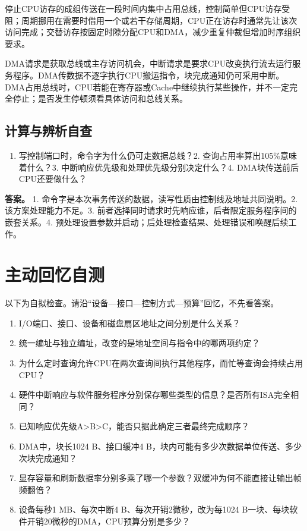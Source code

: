 停止CPU访存的成组传送在一段时间内集中占用总线，控制简单但CPU访存受阻；周期挪用在需要时借用一个或若干存储周期，CPU正在访存时通常先让该次访问完成；交替访存按固定时隙分配CPU和DMA，减少重复仲裁但增加时序组织要求。

DMA请求是获取总线或主存访问机会，中断请求是要求CPU改变执行流去运行服务程序。DMA传数据不逐字执行CPU搬运指令，块完成通知仍可采用中断。DMA占用总线时，CPU若能在寄存器或Cache中继续执行某些操作，并不一定完全停止；是否发生停顿须看具体访问和总线关系。

\subsection{计算与辨析自查}\label{CO07-extra-check}

\begin{enumerate}
\def\labelenumi{\arabic{enumi}.}
\tightlist
\item
  写控制端口时，命令字为什么仍可走数据总线？2. 查询占用率算出105\%意味着什么？3. 中断响应优先级和处理优先级分别决定什么？4. DMA块传送前后CPU还要做什么？
\end{enumerate}

\textbf{答案。} 1. 命令字是本次事务传送的数据，读写性质由控制线及地址共同说明。2. 该方案处理能力不足。3. 前者选择同时请求时先响应谁，后者限定服务程序间的嵌套关系。4. 预处理设置参数并启动；后处理检查结果、处理错误和唤醒后续工作。

\section{主动回忆自测}\label{CO07-recall}

以下为自拟检查。请沿``设备---接口---控制方式---预算''回忆，不先看答案。

\begin{enumerate}
\def\labelenumi{\arabic{enumi}.}
\tightlist
\item
  I/O端口、接口、设备和磁盘扇区地址之间分别是什么关系？
\item
  统一编址与独立编址，改变的是地址空间与指令中的哪两项约定？
\item
  为什么定时查询允许CPU在两次查询间执行其他程序，而忙等查询会持续占用CPU？
\item
  硬件中断响应与软件服务程序分别保存哪些类型的信息？是否所有ISA完全相同？
\item
  已知响应优先级A\textgreater B\textgreater C，能否只据此确定三者最终完成顺序？
\item
  DMA中，块长1024 B、接口缓冲4 B，块内可能有多少次数据单位传送、多少次块完成通知？
\item
  显存容量和刷新数据率分别多乘了哪一个参数？双缓冲为何不能直接让输出帧频翻倍？
\item
  设备每秒1 MB、每次中断4 B、每次开销2微秒，改为每1024 B一块、每块软件开销20微秒的DMA，CPU预算分别是多少？
\end{enumerate}

